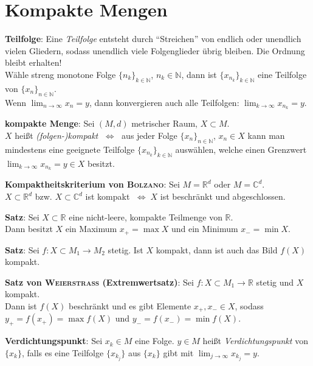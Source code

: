 \section{%
    Kompakte Mengen%
}

\textbf{Teilfolge}: Eine \emph{Teilfolge} entsteht durch "`Streichen"' von
endlich oder unendlich vielen Gliedern, sodass unendlich viele Folgenglieder
übrig bleiben.
Die Ordnung bleibt erhalten! \\
Wähle streng monotone Folge $\{n_k\}_{k \in \mathbb{N}}$,
$n_k \in \mathbb{N}$, dann ist $\{x_{n_k}\}_{k \in \mathbb{N}}$ eine Teilfolge
von $\{x_n\}_{n \in \mathbb{N}}$. \\
Wenn $\lim_{n \to \infty} x_n = y$, dann konvergieren auch alle Teilfolgen:
$\lim_{k \to \infty} x_{n_k} = y$.

\textbf{kompakte Menge}: Sei $(M,d)$ metrischer Raum, $X \subset M$. \\
$X$ heißt \emph{(folgen-)kompakt} $\;\Leftrightarrow\;$ aus jeder Folge
$\{x_n\}_{n \in \mathbb{N}}$, $x_n \in X$ kann man mindestens eine geeignete
Teilfolge $\{x_{n_k}\}_{k \in \mathbb{N}}$ auswählen, welche einen Grenzwert
$\lim_{k \to \infty} x_{n_k} = y \in X$ besitzt.

\textbf{Kompaktheitskriterium von \textsc{Bolzano}}: Sei $M = \mathbb{R}^d$
oder $M = \mathbb{C}^d$. \\
$X \subset \mathbb{R}^d$ bzw. $X \subset \mathbb{C}^d$ ist kompakt
$\;\Leftrightarrow\; X$ ist beschränkt und abgeschlossen.

\linie

\textbf{Satz}: Sei $X \subset \mathbb{R}$ eine nicht-leere, kompakte
Teilmenge von $\mathbb{R}$. \\
Dann besitzt $X$ ein Maximum $x_+ = \max X$ und ein Minimum $x_- = \min X$.

\textbf{Satz}: Sei $f: X \subset M_1 \rightarrow M_2$ stetig.
Ist $X$ kompakt, dann ist auch das Bild $f(X)$ kompakt.

\textbf{Satz von \textsc{Weierstraß} (Extremwertsatz)}:
Sei $f: X \subset M_1 \rightarrow \mathbb{R}$ stetig und $X$ kompakt. \\
Dann ist $f(X)$ beschränkt und es gibt Elemente $x_+, x_- \in X$, sodass
$y_+ = f(x_+) = \max f(X)$ und $y_- = f(x_-) = \min f(X)$.

\linie

\textbf{Verdichtungspunkt}: Sei $x_k \in M$ eine Folge.
$y \in M$ heißt \emph{Verdichtungspunkt} von $\{x_k\}$,
falls es eine Teilfolge $\{x_{k_j}\}$ aus $\{x_k\}$ gibt mit
$\lim_{j \to \infty} x_{k_j} = y$.

